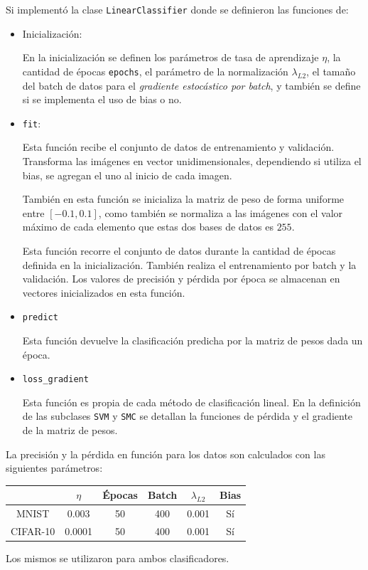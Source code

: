 Si implementó la clase \verb|LinearClassifier| donde se definieron las funciones de:
\begin{itemize}
    \item Inicialización:

    En la inicialización se definen los parámetros de tasa de aprendizaje  $\eta$, la cantidad de épocas \verb|epochs|, el parámetro de la normalización $\lambda_{L2}$, el tamaño del batch de datos  para el \emph{gradiente estocástico por batch}, y también se  define si se implementa el uso de bias o no.

    \item  \verb|fit|:

    Esta función recibe el conjunto de datos de entrenamiento y validación. Transforma las imágenes en vector unidimensionales, dependiendo si utiliza el bias, se agregan el uno al inicio de cada imagen.

    También en esta función se inicializa la matriz  de peso de forma uniforme entre $[-0.1, 0.1]$, como también se normaliza a las imágenes con el valor máximo de cada elemento que estas dos bases de datos es $255$.

    Esta función recorre el conjunto de datos durante la cantidad de épocas definida en la inicialización. También realiza el entrenamiento por batch y la validación. Los valores de precisión y pérdida por época se almacenan en vectores inicializados en esta función.

    \item \verb|predict|

    Esta función devuelve la clasificación predicha por la matriz de pesos dada un época.

    \item \verb|loss_gradient|

    Esta función es propia de cada método de clasificación lineal. En la definición de las subclases \verb|SVM| y \verb|SMC| se detallan la funciones de pérdida y el gradiente de la matriz de pesos.
\end{itemize}

La precisión y la pérdida en función para los datos son calculados con las siguientes parámetros:

\begin{table}[H]
    \centering
    \begin{tabular}{c|c|c|c|c|c}
             &  $\eta$ & Épocas & Batch & $\lambda_{L2}$ & Bias \\ \hline
    MNIST    &  0.003 & 50 & 400 & 0.001 & Sí \\ \hline
    CIFAR-10 &  0.0001 & 50 & 400 & 0.001 & Sí \\ 
    \end{tabular}
\end{table}
Los mismos se utilizaron para ambos clasificadores.

